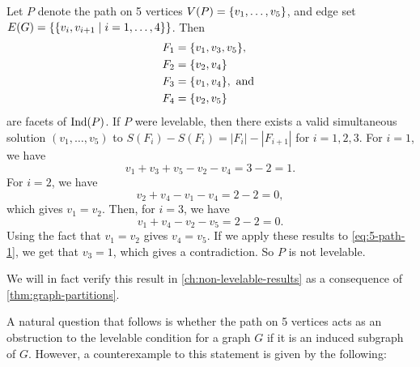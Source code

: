 \begin{example} \label{ex:5-path}
Let $P$ denote the path on 5 vertices $V(P) = \{ v_1, \dots, v_5 \}$, and edge set $E(G) = \{ \{ v_i, v_{i+1} \; | \; i = 1, \dots, 4 \} \}$. Then 
\begin{equation*}
\begin{aligned}
F_1 &= \{ v_1, v_3, v_5 \}, \\
F_2 &= \{ v_2, v_4 \} \\
F_3 &= \{ v_1, v_4 \}, \textrm{ and } \\
F_4 &= \{ v_2, v_5 \}
\end{aligned}
\end{equation*}
are facets of $\textrm{Ind}(P)$. If $P$ were levelable, then there exists a valid simultaneous solution $(v_1, \dots, v_5)$ to $S(F_i) - S(F_i) = |F_i| - |F_{i+1}|$ for $i = 1, 2, 3$. For $i = 1$, we have
\begin{equation} \label{eq:5-path-1}
v_1 + v_3 + v_5 - v_2 - v_4 = 3 - 2 = 1.
\end{equation}
For $i = 2$, we have
\begin{equation*}
v_2 + v_4 - v_1 - v_4 = 2 - 2 = 0,
\end{equation*}
which gives $v_1 = v_2$. Then, for $i = 3$, we have
\begin{equation*}
v_1 + v_4 - v_2 - v_5 = 2 - 2 = 0.
\end{equation*}
Using the fact that $v_1 = v_2$ gives $v_4 = v_5$. If we apply these results to \eqref{eq:5-path-1}, we get that $v_3 = 1$, which gives a contradiction. So $P$ is not levelable.
\end{example}

We will in fact verify this result in \autoref{ch:non-levelable-results} as a consequence of \autoref{thm:graph-partitions}.

A natural question that follows is whether the path on 5 vertices acts as an obstruction to the levelable condition for a graph $G$ if it is an induced subgraph of $G$. However, a counterexample to this statement is given by the following:

